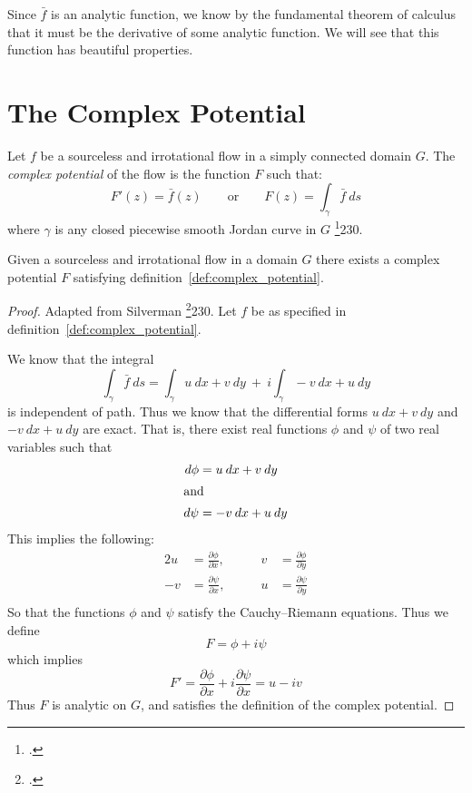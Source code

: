 \documentclass[letterpaper, twoside, 12 pt]{article}
\begin{document}
	Since $\bar f$ is an analytic function, we know by the fundamental theorem of calculus that it must be the derivative of some analytic function.
	We will see that this function has beautiful properties.

\section{The Complex Potential} %
	\label{sec:complex_potential}

	\begin{definition}
	\label{def:complex_potential}
		Let $f$ be a sourceless and irrotational flow in a simply connected domain $G$.
		The \textit{complex potential} of the flow is the function $F$ such that:
		\[
			F'(z) = \bar f(z) \qquad \text{or} \qquad F(z) = \int_\gamma  \bar f \ ds
		\]
		where $\gamma$ is any closed piecewise smooth Jordan curve in $G$ \footcite{silverman}{230}.
	\end{definition}

	\begin{theorem}
		Given a sourceless and irrotational flow in a domain $G$ there exists a complex potential $F$ satisfying definition~\ref{def:complex_potential}.
	\end{theorem}
	\begin{proof}
		Adapted from Silverman \footcite{silverman}{230}.
		Let $f$ be as specified in definition~\ref{def:complex_potential}.

		We know that the integral
		\[
			\int_\gamma \bar f \ ds = \int_\gamma u\> dx + v\> dy \ + \ i \! \int_\gamma -v \> dx + u \> dy
		\]
		is independent of path.
		Thus we know that the differential forms $u\> dx + v\> dy$ and $-v\> dx + u\> dy$ are exact.
		That is, there exist real functions $\phi$ and $\psi$ of two real variables such that 
		\begin{align*}
			d \phi &= u\> dx + v\> dy \\
			\intertext{and}
			d \psi &= -v\> dx + u\> dy
		\end{align*}
		This implies the following:
		\begin{alignat*}{2}
			u &= \frac{\partial \phi}{\partial x},  \qquad	& v &= \frac{\partial \phi}{\partial y} \\[1 em]
			-v &= \frac{\partial \psi}{\partial x}, \qquad	& u &= \frac{\partial \psi}{\partial y} \\
		\end{alignat*}
		So that the functions $\phi$ and $\psi$ satisfy the Cauchy--Riemann equations.
		Thus we define 
		\[
			F = \phi + i \psi
		\]
		which implies
		\[
			F' = \frac{\partial \phi}{\partial x} + i \frac{\partial \psi}{\partial x} = u - iv 
		\]
		Thus $F$ is analytic on $G$, and satisfies the definition of the complex potential.
	\end{proof}
\end{document}
